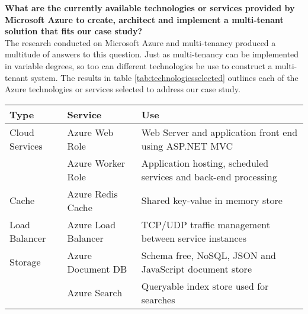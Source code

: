 \textbf{What are the currently available technologies or services provided by Microsoft Azure to create, architect and implement a multi-tenant solution that fits our case study? }
\\
The research conducted on Microsoft Azure and multi-tenancy produced a multitude of answers to this question. Just as multi-tenancy can be implemented in variable degrees, so too can different technologies be use to construct a multi-tenant system. The results in table \ref{tab:technologiesselected} outlines each of the Azure technologies or services selected to address our case study.

\vfill
\begin{table}[htp]
\centering
\begin{tabularx}{\textwidth}{|p{1.9cm}|p{3cm}|X|}
\hline
\rowcolor[HTML]{EFEFEF} 
Type           & Service                 & Use                                                                                                                                                                                                   \\ \hline
Cloud Services & Azure Web Role          & Web Server and application front end using ASP.NET MVC                                                                                                                                                \\\hline
               & Azure Worker Role       & Application hosting, scheduled services and back-end processing                                                                                                                                       \\\hline
Cache          & Azure Redis Cache       & Shared key-value in memory store                                                                                                                                                                      \\\hline
Load Balancer  & Azure Load Balancer     & TCP/UDP traffic management between service instances                                                                                                                                                  \\\hline
Storage        & Azure Document DB       & Schema free, NoSQL, JSON and JavaScript document store                                                                                                                                                \\\hline
               & Azure Search            & Queryable index store used for searches                                                                                                                                                               \\\hline

\end{tabularx}
\end{table}
